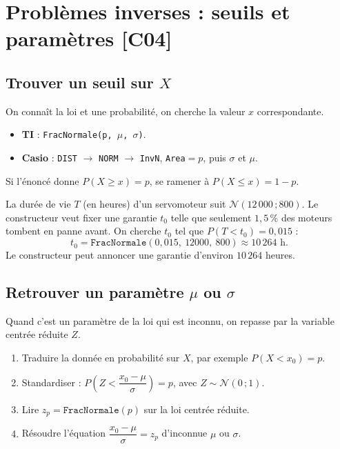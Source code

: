 \documentclass[a4paper,11pt]{article}
\begin{document}
\newpage
\section{Problèmes inverses : seuils et paramètres \hfill {\normalsize\color{uimmred}[C04]}}

\subsection{Trouver un seuil sur \texorpdfstring{$X$}{X}}

On connaît la loi et une probabilité, on cherche la valeur $x$ correspondante.

\begin{calculatrice}[-- Trouver $x$ tel que $P(X \leq x) = p$ pour $\mathcal{N}(\mu\,;\sigma)$]
\begin{itemize}
  \item \textbf{TI} : \texttt{FracNormale(p, $\mu$, $\sigma$)}.
  \item \textbf{Casio} : \texttt{DIST} $\rightarrow$ \texttt{NORM} $\rightarrow$ \texttt{InvN}, \texttt{Area}$=p$, puis $\sigma$ et $\mu$.
\end{itemize}
Si l'énoncé donne $P(X \geq x) = p$, se ramener à $P(X \leq x) = 1 - p$.
\end{calculatrice}

\begin{appliindus}
La durée de vie $T$ (en heures) d'un servomoteur suit $\mathcal{N}(12\,000\,;800)$. Le constructeur veut fixer une garantie $t_0$ telle que seulement $1{,}5\,\%$ des moteurs tombent en panne avant. On cherche $t_0$ tel que $P(T < t_0) = 0{,}015$ :
\[
t_0 = \texttt{FracNormale}(0{,}015,\ 12000,\ 800) \approx 10\,264 \text{ h.}
\]
Le constructeur peut annoncer une garantie d'environ $10\,264$ heures.
\end{appliindus}

\subsection{Retrouver un paramètre \texorpdfstring{$\mu$}{mu} ou \texorpdfstring{$\sigma$}{sigma}}

Quand c'est un paramètre de la loi qui est inconnu, on repasse par la variable centrée réduite $Z$.

\begin{methode}
\begin{enumerate}
  \item Traduire la donnée en probabilité sur $X$, par exemple $P(X < x_0) = p$.
  \item Standardiser : $P\!\left(Z < \dfrac{x_0 - \mu}{\sigma}\right) = p$, avec $Z \sim \mathcal{N}(0\,;1)$.
  \item Lire $z_p = \texttt{FracNormale}(p)$ sur la loi centrée réduite.
  \item Résoudre l'équation $\dfrac{x_0 - \mu}{\sigma} = z_p$ d'inconnue $\mu$ ou $\sigma$.
\end{enumerate}
\end{methode}
\end{document}

